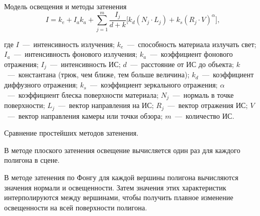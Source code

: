 \documentclass{beamer}
\begin{document}
	\begin{frame}{Модель освещения и методы затенения}
		\[
			I = k_e + I_a k_a + \sum_{j=1}^{m} \frac{I_{j}}{d+k} \bigg[ k_d (N_j \cdot L_j) + k_s (R_j \cdot V)^\alpha \bigg]
		,
		\]

		\footnotesize
		где
		$I$~---~интенсивность излучения;
		$k_e$~---~способность материала излучать свет;
		$I_a$~---~интенсивность фонового излучения;
		$k_a$~---~коэффициент фонового отражения;
		$I_j$~---~интенсивность ИС;
		$d$~---~расстояние от ИС до объекта;
		$k$~---~константана (трюк, чем ближе, тем больше величина);
		$k_d$~---~коэффициент диффузного отражения;
		$k_s$~---~коэффициент зеркального отражения;
		$\alpha$~---~коэффициент блеска поверхности материала;
		$N_j$~---~нормаль в точке поверхности;
		$L_j$~---~вектор направления на ИС;
		$R_j$~---~вектор отражения ИС;
		$V$~---~вектор направления камеры или точки обзора;
		$m$~---~количество ИС.

		\vspace{0.15cm}
		Сравнение простейших методов затенения.

		В методе плоского затенения освещение вычисляется один раз для каждого полигона в сцене.

		В методе затенения по Фонгу для каждой вершины полигона вычисляются значения нормали и освещенности. Затем значения этих характеристик интерполируются между вершинами, чтобы получить плавное изменение освещенности на всей поверхности полигона.



		
	\end{frame}
\end{document}
